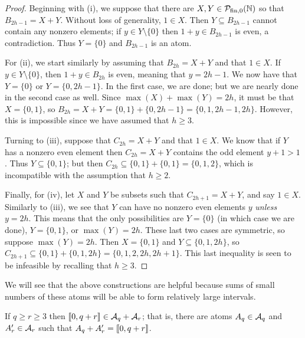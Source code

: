 \begin{proof}
	Beginning with (i), we suppose that there are $X,Y\in {\mathcal{P}_{\textrm{fin},0}(\mathbb{N})}$ so that $B_{2h-1} = X + Y$.
	Without loss of generality, $1\in X$.
	Then $Y\subseteq B_{2h-1}$ cannot contain any nonzero elements; if $y\in Y\setminus\{0\}$ then $1+y\in B_{2h-1}$ is even, a contradiction.
	Thus $Y = \{0\}$ and $B_{2h-1}$ is an atom.
	
	For (ii), we start similarly by assuming that $B_{2h} = X + Y$ and that $1\in X$.
	If $y\in Y \setminus\{0\}$, then $1+y\in B_{2h}$ is even, meaning that $y = 2h-1$.
	We now have that $Y = \{0\}$ or $Y = \{0,2h-1\}$.
	In the first case, we are done; but we are nearly done in the second case as well.  
	Since $\max(X) + \max(Y) = 2h$, it must be that $X = \{0,1\}$, so $B_{2h} = X+Y = \{0,1\} + \{0,2h-1\} = \{0,1,2h-1,2h\}$.
	However, this is impossible since we have assumed that $h\ge 3$.
	
	Turning to (iii), suppose that $C_{2h} = X + Y$ and that $1\in X$.
	We know that if $Y$ has a nonzero even element then $C_{2h} = X + Y$ contains the odd element $y+1 > 1$.
	Thus $Y \subseteq \{0,1\}$; but then $C_{2h} \subseteq \{0,1\} + \{0,1\} = \{0,1,2\}$, which is incompatible with the assumption that $h\ge 2$.
	
	Finally, for (iv), let $X$ and $Y$ be subsets such that $C_{2h+1} = X + Y$, and say $1\in X$.
	Similarly to (iii), we see that $Y$ can have no nonzero even elements $y$ \textit{unless} $y=2h$.
	This means that the only possibilities are $Y = \{0\}$ (in which case we are done), $Y = \{0,1\}$, or $\max(Y) = 2h$.
	These last two cases are symmetric, so suppose $\max(Y) = 2h$.
	Then $X = \{0,1\}$ and $Y \subseteq \{0,1,2h\}$, so $C_{2h+1} \subseteq \{0,1\} + \{0,1,2h\} = \{0,1,2,2h,2h+1\}$.
	This last inequality is seen to be infeasible by recalling that $h\ge 3$.
\end{proof}

We will see that the above constructions are helpful because sums of small numbers of these atoms will be able to form relatively large intervals.

\begin{lemma} \label{lem:two-part types}
	If $q\ge r \ge 3$ then $\llbracket 0, q+r \rrbracket \in \mathcal{A}_q + \mathcal{A}_r$; that is, there are atoms $A_q\in \mathcal{A}_q$ and $A'_r\in \mathcal{A}_r$ such that $A_q + A'_r = \llbracket 0,q+r \rrbracket$.
\end{lemma}

